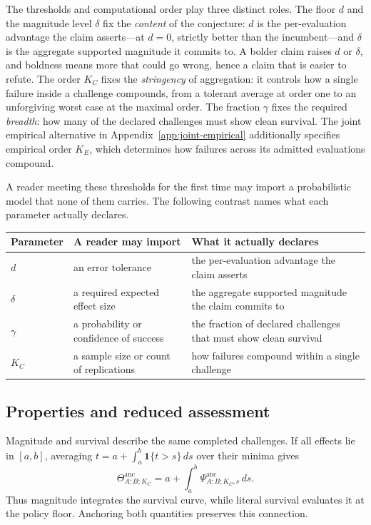 \documentclass[11pt]{article}
\newcommand{\Psianc}{\Psi^{\mathrm{anc}}}
\newcommand{\Thetaanc}{\Theta^{\mathrm{anc}}}
\theoremstyle{remark}
\begin{document}
The thresholds and computational order play three distinct roles. The floor $d$
and the magnitude level $\delta$ fix the \emph{content} of the conjecture: $d$
is the per-evaluation advantage the claim asserts---at $d=0$, strictly better
than the incumbent---and $\delta$ is the aggregate supported magnitude it
commits to. A bolder claim raises $d$ or $\delta$, and boldness means more that
could go wrong, hence a claim that is easier to refute. The order $K_C$ fixes the \emph{stringency} of aggregation: it controls how a single
failure inside a challenge compounds, from a tolerant average at order one to an
unforgiving worst case at the maximal order. The fraction $\gamma$ fixes the
required \emph{breadth}: how many of the declared challenges must show clean
survival. The joint empirical alternative in Appendix~\ref{app:joint-empirical}
additionally specifies empirical order $K_E$, which determines how failures
across its admitted evaluations compound.

A reader meeting these thresholds for the first time may import a probabilistic
model that none of them carries. The following contrast names what each
parameter actually declares.
\begin{center}
\begin{tabularx}{0.96\textwidth}{@{}l>{\raggedright\arraybackslash}X>{\raggedright\arraybackslash}X@{}}
\toprule
Parameter & A reader may import & What it actually declares \\
\midrule
$d$ & an error tolerance & the per-evaluation advantage the claim asserts \\
$\delta$ & a required expected effect size & the aggregate supported magnitude the claim commits to \\
$\gamma$ & a probability or confidence of success & the fraction of declared challenges that must show clean survival \\
$K_C$ & a sample size or count of replications & how failures compound within a single challenge \\
\bottomrule
\end{tabularx}
\end{center}

\subsection{Properties and reduced assessment}
\label{sec:context-properties}

Magnitude and survival describe the same completed challenges. If all effects
lie in $[a,b]$, averaging
$t=a+\int_a^b\mathbf1\{t>s\}\,ds$ over their minima gives
\[
\Thetaanc_{A:B;K_C}
=a+\int_a^b\Psianc_{A:B;K_C,s}\,ds.
\]
Thus magnitude integrates the survival curve, while literal survival evaluates
it at the policy floor. Anchoring both quantities preserves this connection.
\end{document}
